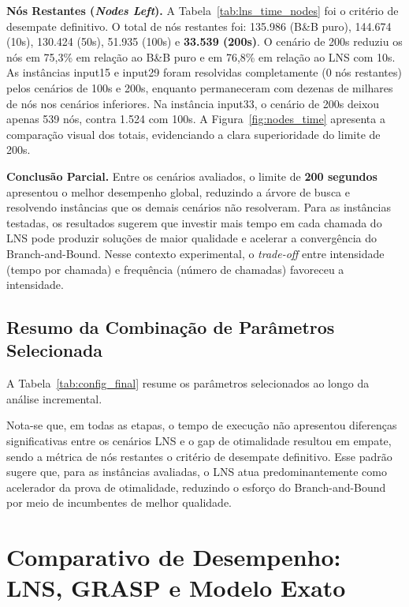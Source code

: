 

\textbf{Nós Restantes (\emph{Nodes Left}).} A Tabela~\ref{tab:lns_time_nodes} foi o critério de desempate definitivo. O total de nós restantes foi: 135.986 (B\&B puro), 144.674 (10s), 130.424 (50s), 51.935 (100s) e \textbf{33.539 (200s)}. O cenário de 200s reduziu os nós em 75,3\% em relação ao B\&B puro e em 76,8\% em relação ao LNS com 10s. As instâncias input15 e input29 foram resolvidas completamente (0 nós restantes) pelos cenários de 100s e 200s, enquanto permaneceram com dezenas de milhares de nós nos cenários inferiores. Na instância input33, o cenário de 200s deixou apenas 539 nós, contra 1.524 com 100s. A Figura~\ref{fig:nodes_time} apresenta a comparação visual dos totais, evidenciando a clara superioridade do limite de 200s.





\textbf{Conclusão Parcial.} Entre os cenários avaliados, o limite de \textbf{200 segundos} apresentou o melhor desempenho global, reduzindo a árvore de busca e resolvendo instâncias que os demais cenários não resolveram. Para as instâncias testadas, os resultados sugerem que investir mais tempo em cada chamada do LNS pode produzir soluções de maior qualidade e acelerar a convergência do Branch-and-Bound. Nesse contexto experimental, o \emph{trade-off} entre intensidade (tempo por chamada) e frequência (número de chamadas) favoreceu a intensidade.

\subsection{Resumo da Combinação de Parâmetros Selecionada}

A Tabela~\ref{tab:config_final} resume os parâmetros selecionados ao longo da análise incremental.



Nota-se que, em todas as etapas, o tempo de execução não apresentou diferenças significativas entre os cenários LNS e o gap de otimalidade resultou em empate, sendo a métrica de nós restantes o critério de desempate definitivo. Esse padrão sugere que, para as instâncias avaliadas, o LNS atua predominantemente como acelerador da prova de otimalidade, reduzindo o esforço do Branch-and-Bound por meio de incumbentes de melhor qualidade.

\section{Comparativo de Desempenho: LNS, GRASP e Modelo Exato} \label{sec:comparativo}

